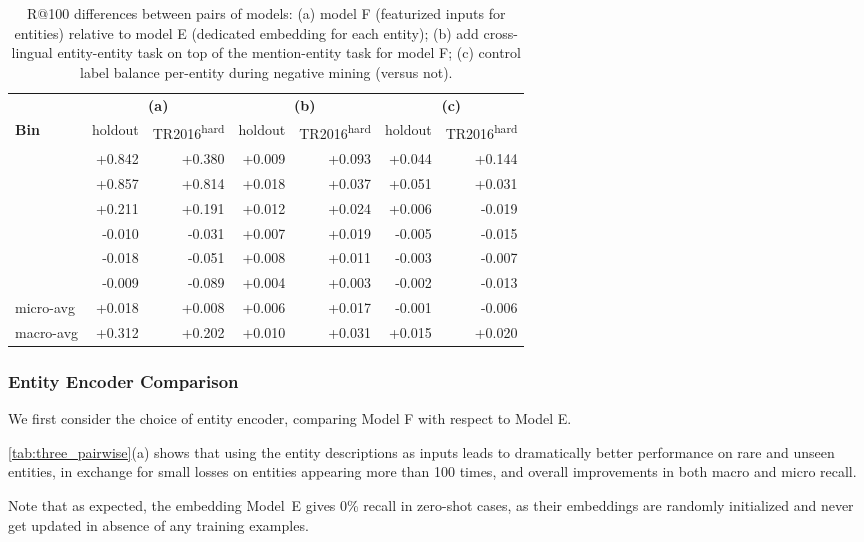 \documentclass[11pt,a4paper]{article}
\newcommand*{\TR}{TR2016\textsuperscript{hard}}
\begin{document}
\begin{table*}
\centering
\begin{tabular}{l rr rr rr} \toprule
 & \multicolumn{2}{c}{\bf (a)}  & \multicolumn{2}{c}{\bf (b)}  & \multicolumn{2}{c}{\bf (c)}   \\
 \cmidrule(lr){2-3}
 \cmidrule(lr){4-5}
 \cmidrule(lr){6-7}
\textbf{Bin} & holdout & \TR{} & holdout & \TR{} & holdout & \TR{} \\ 
\midrule
 & +0.842 & +0.380 & +0.009 & +0.093 & +0.044 & +0.144 \\
 & +0.857 & +0.814 & +0.018 & +0.037 & +0.051 & +0.031 \\
 & +0.211 & +0.191 & +0.012 & +0.024 & +0.006 & -0.019 \\
 & -0.010 & -0.031 & +0.007 & +0.019 & -0.005 & -0.015 \\
 & -0.018 & -0.051 & +0.008 & +0.011 & -0.003 & -0.007 \\
 & -0.009 & -0.089 & +0.004 & +0.003 & -0.002 & -0.013 \\ \midrule
micro-avg & +0.018 & +0.008 & +0.006 & +0.017 & -0.001 & -0.006 \\
macro-avg & +0.312 & +0.202 & +0.010 & +0.031 & +0.015 & +0.020 \\ \bottomrule
\end{tabular}
\caption{R@100 differences between pairs of models:
(a) model F (featurized inputs for entities) relative to model E (dedicated embedding for each entity);
(b) add cross-lingual entity-entity task on top of the mention-entity task for model F;
(c) control label balance per-entity during negative mining (versus not).
\label{tab:three_pairwise}}
\end{table*}


\subsubsection{Entity Encoder Comparison}
We first consider the choice of entity encoder, comparing Model F with respect to Model E.

\autoref{tab:three_pairwise}(a) shows that using the entity descriptions as inputs leads to dramatically better performance on rare and unseen entities, in exchange for small losses on entities appearing more than 100 times, and overall improvements in both macro and micro recall.

Note that as expected, the embedding Model~E
gives 0\% recall in zero-shot cases, 
as their embeddings are randomly
initialized and never get updated in absence of any training examples.
\end{document}
